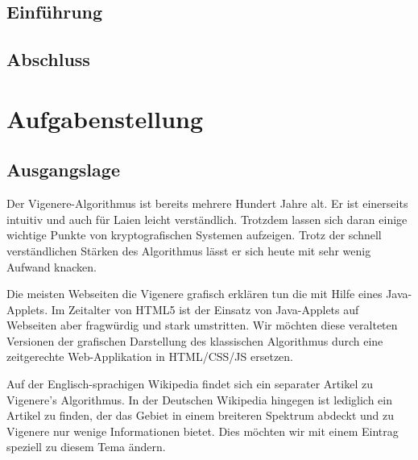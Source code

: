 \documentclass[11pt,paper=a4,final]{scrartcl}
\begin{document}
\subsection{Einf\"uhrung}
\subsection{Abschluss}
\section{Aufgabenstellung}
\subsection{Ausgangslage}
Der Vigenere-Algorithmus ist bereits mehrere Hundert Jahre alt. Er ist
einerseits intuitiv und auch f\"ur Laien leicht verst\"andlich. Trotzdem lassen
sich daran einige wichtige Punkte von kryptografischen Systemen aufzeigen. Trotz
der schnell verst\"andlichen St\"arken des Algorithmus l\"asst er sich heute mit
sehr wenig Aufwand knacken. 

Die meisten Webseiten die Vigenere grafisch erkl\"aren tun die mit Hilfe eines
Java-Applets. Im Zeitalter von HTML5 ist der Einsatz von Java-Applets auf
Webseiten aber fragw\"urdig und stark umstritten. Wir m\"ochten diese veralteten
Versionen der grafischen Darstellung des klassischen Algorithmus durch eine
zeitgerechte Web-Applikation in HTML/CSS/JS ersetzen.

Auf der Englisch-sprachigen Wikipedia findet sich ein separater Artikel zu
Vigenere's Algorithmus. In der Deutschen Wikipedia hingegen ist lediglich ein
Artikel zu finden, der das Gebiet in einem breiteren Spektrum abdeckt und zu
Vigenere nur wenige Informationen bietet. Dies m\"ochten wir mit einem Eintrag
speziell zu diesem Tema \"andern.
\end{document}

